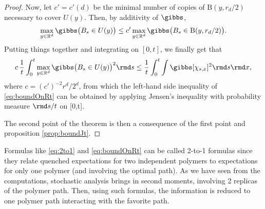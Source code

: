 \begin{proof}
Now, let $c'=c'(d)$ be the minimal number of copies of $\mathrm{B}(y,r_d/2)$ necessary to cover $U(y)$. Then, by additivity of $\gibbs$,
\begin{equation} \label{eq:num-2}
\max_{y\in\mathbb{R}^d} \gibbs\big(B_s\in U(y)\big) \leq c' \max_{y\in\mathbb{R}^d} \gibbs\big(B_s\in \mathrm{B}(y,r_d/2)\big).
\end{equation}
Putting things together and integrating on $[0,t]$, we finally get that
\[ c\,\frac{1}{t} \int_0^t \max_{y\in\mathbb{R}^d} \gibbs\big(B_s\in U(y)\big)^2 \rmd s \leq  \frac{1}{t}\int_0^t \int \gibbs[\chi_{s,x}]^2 \rmd s \rmd x,\]
where $c=(c')^{-2} {r^d}/{2^d}$, from which the left-hand side inequality of \eqref{eq:boundOnRt} can be obtained by applying Jensen's inequality with probability measure $\rmd s /t$ on [0,t].

The second point of the theorem is then a consequence of the first point and proposition \ref{prop:boundJt}.
\end{proof}
\begin{remark}
Formulas like \eqref{eq:2to1} and \eqref{eq:boundOnRt} can be called 2-to-1 formulas since they relate quenched expectations for two independent polymers to
expectations for only one polymer (and involving the optimal path). As we have seen from the computations, stochastic analysis brings in second moments, involving 2 replicas of the polymer path. Then, using such formulas, the information is reduced to one polymer path interacting with the favorite path.
\end{remark}

